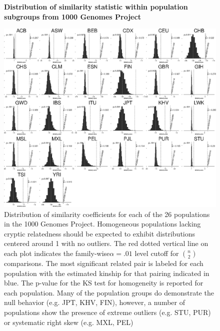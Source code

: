 \begin{figure}
\center\textbf{Distribution of similarity statistic within population subgroups
from 1000 Genomes Project }

\includegraphics[]{./figures/figure1_bw.eps}
\caption{Distribution of similarity coefficients for each of the 26 populations
in the 1000 Genomes Project. Homogeneous populations lacking cryptic
relatedness should be expected to exhibit distributions centered around
1 with no outliers. The red dotted vertical line on each plot indicates
the family-wise$\alpha=.01$ level cutoff for ${n \choose 2}$ comparisons.
The most significant related pair is labeled for each population with
the estimated kinship for that pairing indicated in blue. The p-value
for the KS test for homogeneity is reported for each population. Many
of the population groups do demonstrate the null behavior (e.g. JPT,
KHV, FIN), however, a number of populations show the presence of extreme
outliers (e.g. STU, PUR) or systematic right skew (e.g. MXL, PEL)}
\label{fig: All s plots}
\end{figure}

